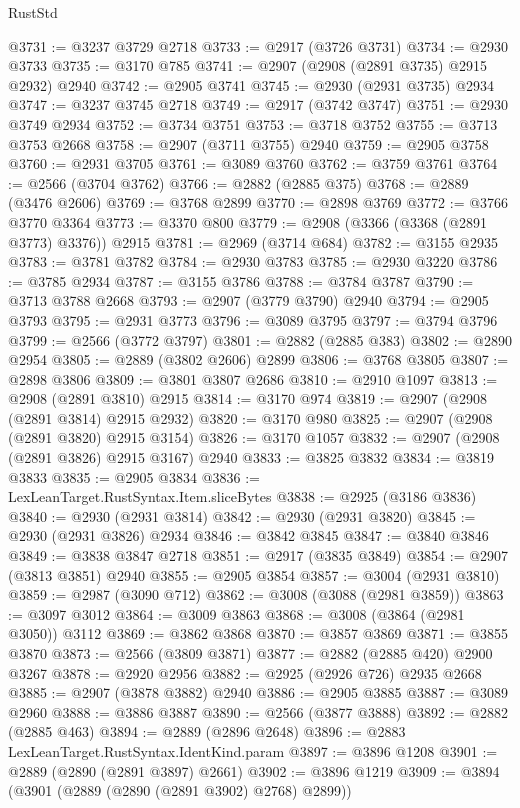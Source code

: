 \begin{lexlean}{RustStd}
\begin{coremodule}
@3731 := @3237 @3729 @2718
@3733 := @2917 (@3726 @3731)
@3734 := @2930 @3733
@3735 := @3170 @785
@3741 := @2907 (@2908 (@2891 @3735) @2915 @2932) @2940
@3742 := @2905 @3741
@3745 := @2930 (@2931 @3735) @2934
@3747 := @3237 @3745 @2718
@3749 := @2917 (@3742 @3747)
@3751 := @2930 @3749 @2934
@3752 := @3734 @3751
@3753 := @3718 @3752
@3755 := @3713 @3753 @2668
@3758 := @2907 (@3711 @3755) @2940
@3759 := @2905 @3758
@3760 := @2931 @3705
@3761 := @3089 @3760
@3762 := @3759 @3761
@3764 := @2566 (@3704 @3762)
@3766 := @2882 (@2885 @375)
@3768 := @2889 (@3476 @2606)
@3769 := @3768 @2899
@3770 := @2898 @3769
@3772 := @3766 @3770 @3364
@3773 := @3370 @800
@3779 := @2908 (@3366 (@3368 (@2891 @3773) @3376)) @2915
@3781 := @2969 (@3714 @684)
@3782 := @3155 @2935
@3783 := @3781 @3782
@3784 := @2930 @3783
@3785 := @2930 @3220
@3786 := @3785 @2934
@3787 := @3155 @3786
@3788 := @3784 @3787
@3790 := @3713 @3788 @2668
@3793 := @2907 (@3779 @3790) @2940
@3794 := @2905 @3793
@3795 := @2931 @3773
@3796 := @3089 @3795
@3797 := @3794 @3796
@3799 := @2566 (@3772 @3797)
@3801 := @2882 (@2885 @383)
@3802 := @2890 @2954
@3805 := @2889 (@3802 @2606) @2899
@3806 := @3768 @3805
@3807 := @2898 @3806
@3809 := @3801 @3807 @2686
@3810 := @2910 @1097
@3813 := @2908 (@2891 @3810) @2915
@3814 := @3170 @974
@3819 := @2907 (@2908 (@2891 @3814) @2915 @2932)
@3820 := @3170 @980
@3825 := @2907 (@2908 (@2891 @3820) @2915 @3154)
@3826 := @3170 @1057
@3832 := @2907 (@2908 (@2891 @3826) @2915 @3167) @2940
@3833 := @3825 @3832
@3834 := @3819 @3833
@3835 := @2905 @3834
@3836 := LexLeanTarget.RustSyntax.Item.sliceBytes
@3838 := @2925 (@3186 @3836)
@3840 := @2930 (@2931 @3814)
@3842 := @2930 (@2931 @3820)
@3845 := @2930 (@2931 @3826) @2934
@3846 := @3842 @3845
@3847 := @3840 @3846
@3849 := @3838 @3847 @2718
@3851 := @2917 (@3835 @3849)
@3854 := @2907 (@3813 @3851) @2940
@3855 := @2905 @3854
@3857 := @3004 (@2931 @3810)
@3859 := @2987 (@3090 @712)
@3862 := @3008 (@3088 (@2981 @3859))
@3863 := @3097 @3012
@3864 := @3009 @3863
@3868 := @3008 (@3864 (@2981 @3050)) @3112
@3869 := @3862 @3868
@3870 := @3857 @3869
@3871 := @3855 @3870
@3873 := @2566 (@3809 @3871)
@3877 := @2882 (@2885 @420) @2900 @3267
@3878 := @2920 @2956
@3882 := @2925 (@2926 @726) @2935 @2668
@3885 := @2907 (@3878 @3882) @2940
@3886 := @2905 @3885
@3887 := @3089 @2960
@3888 := @3886 @3887
@3890 := @2566 (@3877 @3888)
@3892 := @2882 (@2885 @463)
@3894 := @2889 (@2896 @2648)
@3896 := @2883 LexLeanTarget.RustSyntax.IdentKind.param
@3897 := @3896 @1208
@3901 := @2889 (@2890 (@2891 @3897) @2661)
@3902 := @3896 @1219
@3909 := @3894 (@3901 (@2889 (@2890 (@2891 @3902) @2768) @2899))

\end{coremodule}
\end{lexlean}
